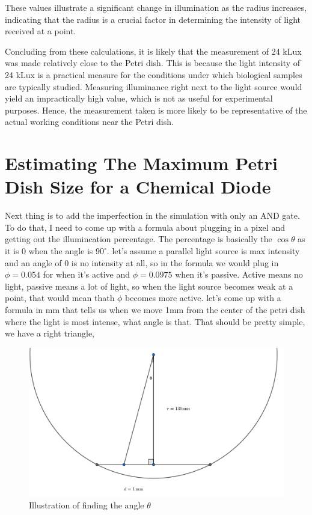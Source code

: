 These values illustrate a significant change in illumination as the radius increases, indicating that the radius is a crucial factor in determining the intensity of light received at a point.

Concluding from these calculations, it is likely that the measurement of 24 kLux was made relatively close to the Petri dish. This is because the light intensity of 24 kLux is a practical measure for the conditions under which biological samples are typically studied. Measuring illuminance right next to the light source would yield an impractically high value, which is not as useful for experimental purposes. Hence, the measurement taken is more likely to be representative of the actual working conditions near the Petri dish.


\section{Estimating The Maximum Petri Dish Size for a Chemical Diode \citep{gorecki2003chemical}} \label{sec:computer-size-limitations}


Next thing is to add the imperfection in the simulation with only an AND gate. To do that, I need to come up with a formula about plugging in a pixel and getting out the illumincation percentage. 
The percentage is basically the $\cos\theta$ as it is 0 when the angle is $90^\circ$.
let's assume a parallel light source is max intensity and an angle of 0 is no intensity at all, so in the formula we would plug in $\phi=0.054$ for when it's active and $\phi=0.0975$ when it's passive. Active means no light, passive means a lot of light, so when the light source becomes weak at a point, that would mean thath $\phi$ becomes more active. 
let's come up with a formula in mm that tells us when we move 1mm from the center of the petri dish where the light is most intense, what angle is that. That should be pretty simple, we have a right triangle, 
\begin{figure}
    \centering
    \includegraphics[width=1\linewidth]{geogebra-export (1).png}
    \caption{Illustration of finding the angle $\theta$}
    \label{fig:finding-theta}
\end{figure}

